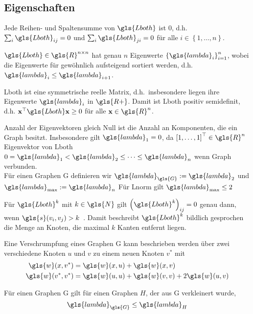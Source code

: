 \subsection{Eigenschaften}

Jede Reihen- und Spaltensumme von $\gls{Lboth}$ ist $0$, d.h.\ $\sum_i \gls{Lboth}_{ij} = 0$ und $\sum_i \gls{Lboth}_{ji} = 0$ für alle $i \in \left\{1, \ldots, n\right\}$.

$\gls{Lboth} \in \gls{R}^{n \times n}$ hat genau $n$ Eigenwerte ${\left\{\gls{lambda}_i\right\}}_{i = 1}^n$, wobei die Eigenwerte für gewöhnlich aufsteigend sortiert werden, d.h.\ $\gls{lambda}_i \leq \gls{lambda}_{i+1}$.

\gls{Lboth} ist eine symmetrische reelle Matrix, d.h.\ insbesondere liegen ihre Eigenwerte $\gls{lambda}_i$ in $\gls{R+}$.
Damit ist \gls{Lboth} positiv semidefinit, d.h. $\ve{x}^{\top}\gls{Lboth}\ve{x} \geq 0$ für alle $\ve{x} \in \gls{R}^n$.

Anzahl der Eigenvektoren gleich Null ist die Anzahl an Komponenten, die ein Graph besitzt.
Insbesondere gilt $\gls{lambda}_1 = 0$, da ${\left[1, \ldots, 1\right]}^{\top} \in \gls{R}^n$ Eigenvektor von \gls{Lboth}\\
$0 = \gls{lambda}_1 < \gls{lambda}_2 \leq \cdots \leq \gls{lambda}_n$ wenn Graph verbunden.\\
Für einen Graphen \gls{G} definieren wir $\gls{lambda}_{\gls{G}} := \gls{lambda}_2$ und $\gls{lambda}_{\max} := \gls{lambda}_n$
Für \gls{Lnorm} gilt $\gls{lambda}_{\max} \leq 2$

Für $\gls{Lboth}^{k}$ mit $k \in \gls{N}$ gilt ${\left(\gls{Lboth}^k\right)}_{ij} = 0$ genau dann, wenn $\gls{s}\left(v_i, v_j\right) > k$~\cite{Hammond}.
Damit beschreibt $\gls{Lboth}^k$ bildlich gesprochen die Menge an Knoten, die maximal $k$ Kanten entfernt liegen.

Eine Verschrumpfung eines Graphen \gls{G} kann beschrieben werden über zwei verschiedene Knoten $u$ und $v$ zu einem neuen Knoten $v^*$ mit
\begin{align}
  \gls{w}\left(x,v^*\right) &= \gls{w}\left(x, u\right) + \gls{w}\left(x, v\right)\\
  \gls{w}\left(v^*, v^*\right) &= \gls{w}\left(u, u\right) + \gls{w}\left(v, v\right) + 2\gls{w}\left(u,v\right)
\end{align}

Für einen Graphen \gls{G} gilt für einen Graphen $H$, der aus \gls{G} verkleinert wurde,
\begin{equation}
  \gls{lambda}_{\gls{G}} \leq \gls{lambda}_H
\end{equation}

